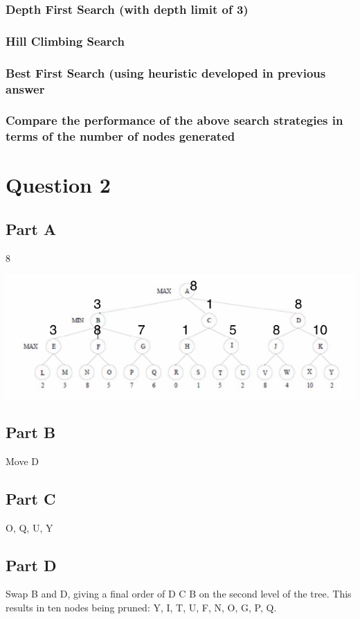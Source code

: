 \documentclass[a4paper]{article}
\begin{document}
\subsubsection{Depth First Search (with depth limit of 3)}

\subsubsection{Hill Climbing Search}

\subsubsection{Best First Search (using heuristic developed in previous answer}

\subsubsection{Compare the performance of the above search strategies in terms of the number of nodes generated}

\section{Question 2}



\subsection{Part A}
8
\begin{center}
\includegraphics[width=1\textwidth]{a1q2a.png}
\end{center}

\subsection{Part B}
Move D

\subsection{Part C}
{O, Q, U, Y}

\subsection{Part D}
Swap B and D, giving a final order of {D C B} on the second level of the tree.
This results in ten nodes being pruned: {Y, I, T, U, F, N, O, G, P, Q}.
\end{document}
